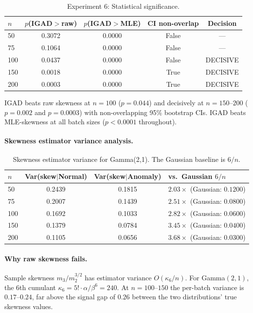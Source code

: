 \documentclass[12pt]{article}
\begin{document}
\begin{table}[h]
\centering
\caption{Experiment 6: Statistical significance.}
\begin{tabular}{lcccc}
\toprule
$n$ & $p$(IGAD$>$raw) & $p$(IGAD$>$MLE) & CI non-overlap & Decision \\
\midrule
50 & 0.3072 & 0.0000 & False & --- \\
75 & 0.1064 & 0.0000 & False & --- \\
100 & 0.0437 & 0.0000 & False & DECISIVE \\
150 & 0.0018 & 0.0000 & True & DECISIVE \\
200 & 0.0003 & 0.0000 & True & DECISIVE \\
\bottomrule
\end{tabular}
\end{table}

IGAD beats raw skewness at $n=100$ ($p=0.044$) and decisively at $n=150$--$200$
($p=0.002$ and $p=0.0003$) with non-overlapping 95\% bootstrap CIs. IGAD beats
MLE-skewness at all batch sizes ($p<0.0001$ throughout).

\paragraph{Skewness estimator variance analysis.}

\begin{table}[h]
\centering
\caption{Skewness estimator variance for Gamma(2,1). The Gaussian baseline is $6/n$.}
\begin{tabular}{lccl}
\toprule
$n$ & Var(skew$|$Normal) & Var(skew$|$Anomaly) & vs.\ Gaussian $6/n$ \\
\midrule
50 & 0.2439 & 0.1815 & $2.03\times$ (Gaussian: $0.1200$) \\
75 & 0.2007 & 0.1439 & $2.51\times$ (Gaussian: $0.0800$) \\
100 & 0.1692 & 0.1033 & $2.82\times$ (Gaussian: $0.0600$) \\
150 & 0.1379 & 0.0784 & $3.45\times$ (Gaussian: $0.0400$) \\
200 & 0.1105 & 0.0656 & $3.68\times$ (Gaussian: $0.0300$) \\
\bottomrule
\end{tabular}
\end{table}

\paragraph{Why raw skewness fails.}
Sample skewness $m_3/m_2^{3/2}$ has estimator variance $O(\kappa_6/n)$. For
Gamma$(2,1)$, the 6th cumulant $\kappa_6 = 5!\cdot\alpha/\beta^6 = 240$. At
$n=100$--$150$ the per-batch variance is $0.17$--$0.24$, far above the signal
gap of $0.26$ between the two distributions' true skewness values.
\end{document}
